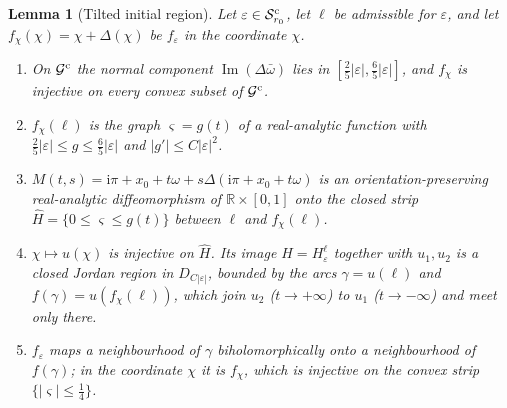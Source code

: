 \documentclass[11pt]{amsart}
\newtheorem{lemma}[theorem]{Lemma}
\theoremstyle{definition}
\newcommand{\ii}{\mathrm{i}}
\begin{document}
\begin{lemma}[Tilted initial region]\label{lem:crescent}
Let $\varepsilon\in\mathcal S^{\rm c}_{r_0}$, let $\ell$ be admissible for $\varepsilon$, and let
$f_\chi(\chi)=\chi+\Delta(\chi)$ be $f_\varepsilon$ in the coordinate $\chi$.
\begin{enumerate}
\item On $\mathcal G^{\rm c}$ the normal component
  $\operatorname{Im}(\Delta\bar\omega)$ lies in $[\tfrac25|\varepsilon|,\tfrac65|\varepsilon|]$, and $f_\chi$
  is injective on every convex subset of $\mathcal G^{\rm c}$.
\item $f_\chi(\ell)$ is the graph $\varsigma=g(t)$ of a real-analytic function with
  $\tfrac25|\varepsilon|\le g\le\tfrac65|\varepsilon|$ and $|g'|\le C|\varepsilon|^2$.
\item $M(t,s)=\ii\pi+x_0+t\omega+s\Delta(\ii\pi+x_0+t\omega)$ is an
  orientation-preserving real-analytic diffeomorphism of $\mathbb R\times[0,1]$
  onto the closed strip $\hat H=\{0\le\varsigma\le g(t)\}$ between $\ell$ and $f_\chi(\ell)$.
\item $\chi\mapsto u(\chi)$ is injective on $\hat H$.  Its image $H=H^\ell_\varepsilon$
  together with $u_1,u_2$ is a closed Jordan region in $D_{C|\varepsilon|}$, bounded by
  the arcs $\gamma=u(\ell)$ and $f(\gamma)=u(f_\chi(\ell))$, which join $u_2$
  ($t\to+\infty$) to $u_1$ ($t\to-\infty$) and meet only there.
\item $f_\varepsilon$ maps a neighbourhood of $\gamma$ biholomorphically onto a
  neighbourhood of $f(\gamma)$; in the coordinate $\chi$ it is $f_\chi$, which is
  injective on the convex strip $\{|\varsigma|\le\tfrac14\}$.
\end{enumerate}
\end{lemma}
\end{document}
